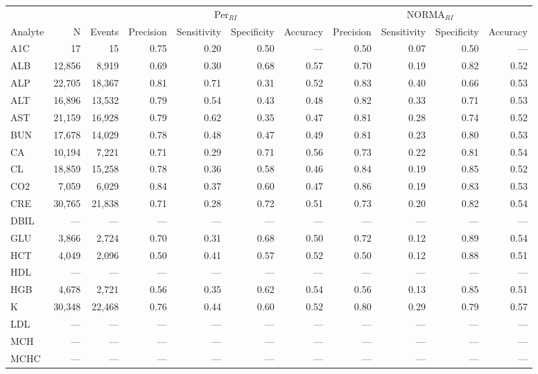 \begin{table}[ht]
\centering
\footnotesize
\begin{tabular}{lrrrrrrrrrr}
\toprule
 & &  & \multicolumn{4}{c}{Per$_{RI}$} & \multicolumn{4}{c}{NORMA$_{RI}$} \\
\cmidrule(lr){4-7} \cmidrule(lr){8-11}
Analyte & N & Events & Precision & Sensitivity & Specificity & Accuracy & Precision & Sensitivity & Specificity & Accuracy \\
\midrule
A1C & 17 & 15 & 0.75 & 0.20 & 0.50 & --- & 0.50 & 0.07 & 0.50 & --- \\
ALB & 12,856 & 8,919 & 0.69 & 0.30 & 0.68 & 0.57 & 0.70 & 0.19 & 0.82 & 0.52 \\
ALP & 22,705 & 18,367 & 0.81 & 0.71 & 0.31 & 0.52 & 0.83 & 0.40 & 0.66 & 0.53 \\
ALT & 16,896 & 13,532 & 0.79 & 0.54 & 0.43 & 0.48 & 0.82 & 0.33 & 0.71 & 0.53 \\
AST & 21,159 & 16,928 & 0.79 & 0.62 & 0.35 & 0.47 & 0.81 & 0.28 & 0.74 & 0.52 \\
BUN & 17,678 & 14,029 & 0.78 & 0.48 & 0.47 & 0.49 & 0.81 & 0.23 & 0.80 & 0.53 \\
CA & 10,194 & 7,221 & 0.71 & 0.29 & 0.71 & 0.56 & 0.73 & 0.22 & 0.81 & 0.54 \\
CL & 18,859 & 15,258 & 0.78 & 0.36 & 0.58 & 0.46 & 0.84 & 0.19 & 0.85 & 0.52 \\
CO2 & 7,059 & 6,029 & 0.84 & 0.37 & 0.60 & 0.47 & 0.86 & 0.19 & 0.83 & 0.53 \\
CRE & 30,765 & 21,838 & 0.71 & 0.28 & 0.72 & 0.51 & 0.73 & 0.20 & 0.82 & 0.54 \\
DBIL & --- & --- & --- & --- & --- & --- & --- & --- & --- & --- \\
GLU & 3,866 & 2,724 & 0.70 & 0.31 & 0.68 & 0.50 & 0.72 & 0.12 & 0.89 & 0.54 \\
HCT & 4,049 & 2,096 & 0.50 & 0.41 & 0.57 & 0.52 & 0.50 & 0.12 & 0.88 & 0.51 \\
HDL & --- & --- & --- & --- & --- & --- & --- & --- & --- & --- \\
HGB & 4,678 & 2,721 & 0.56 & 0.35 & 0.62 & 0.54 & 0.56 & 0.13 & 0.85 & 0.51 \\
K & 30,348 & 22,468 & 0.76 & 0.44 & 0.60 & 0.52 & 0.80 & 0.29 & 0.79 & 0.57 \\
LDL & --- & --- & --- & --- & --- & --- & --- & --- & --- & --- \\
MCH & --- & --- & --- & --- & --- & --- & --- & --- & --- & --- \\
MCHC & --- & --- & --- & --- & --- & --- & --- & --- & --- & --- \\

\end{tabular}
\end{table}
